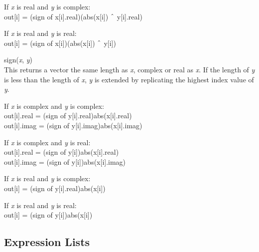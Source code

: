 \begin{description}
\begin{description}
\item{If {\it x} is real and {\it y} is complex:}\\
  {\vt out[i] =} (sign of {\vt x[i].real})({\vt abs(x[i])} $\symbol{94}$
  {\vt y[i].real})

\item{If {\it x} is real and {\it y} is real:}\\
  {\vt out[i] =} (sign of {\vt x[i]})({\vt abs(x[i])} $\symbol{94}$ {\vt y[i]})
\end{description}

\item{\vt sign}({\it x\/}, {\it y\/})\\
This returns a vector the same length as {\it x\/}, complex or real as
{\it x\/}.  If the length of {\it y} is less than the length of {\it
x\/}, {\it y} is extended by replicating the highest index value of
{\it y\/}.

\begin{description}
\item{If {\it x} is complex and {\it y} is complex:}\\
  {\vt out[i].real =} (sign of {\vt y[i].real}){\vt abs(x[i].real)}\\
  {\vt out[i].imag =} (sign of {\vt y[i].imag}){\vt abs(x[i].imag)}

\item{If {\it x} is complex and {\it y} is real:}\\
  {\vt out[i].real =} (sign of {\vt y[i]}){\vt abs(x[i].real)}\\
  {\vt out[i].imag =} (sign of {\vt y[i]}){\vt abs(x[i].imag)}

\item{If {\it x} is real and {\it y} is complex:}\\
  {\vt out[i] =} (sign of {\vt y[i].real}){\vt abs(x[i])}

\item{If {\it x} is real and {\it y} is real:}\\
  {\vt out[i] =} (sign of {\vt y[i]}){\vt abs(x[i])}
\end{description}
\end{description}

\subsection{Expression Lists}



